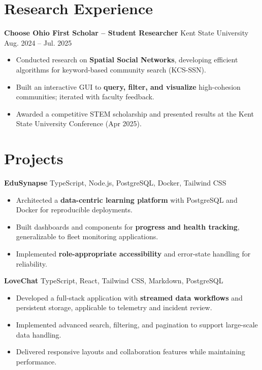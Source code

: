 \documentclass[10pt]{article}
\begin{document}
\section*{Research Experience}
\textbf{Choose Ohio First Scholar -- Student Researcher} \hfill Kent State University \\
Aug. 2024 -- Jul. 2025
\begin{itemize}
    \item Conducted research on \textbf{Spatial Social Networks}, developing efficient algorithms for keyword-based community search (KCS-SSN).
    \item Built an interactive GUI to \textbf{query, filter, and visualize} high-cohesion communities; iterated with faculty feedback.
    \item Awarded a competitive STEM scholarship and presented results at the Kent State University Conference (Apr 2025).
\end{itemize}

\section*{Projects}
\textbf{EduSynapse} \hfill TypeScript, Node.js, PostgreSQL, Docker, Tailwind CSS
\begin{itemize}
    \item Architected a \textbf{data-centric learning platform} with PostgreSQL and Docker for reproducible deployments.
    \item Built dashboards and components for \textbf{progress and health tracking}, generalizable to fleet monitoring applications.
    \item Implemented \textbf{role-appropriate accessibility} and error-state handling for reliability.
\end{itemize}

\textbf{LoveChat} \hfill TypeScript, React, Tailwind CSS, Markdown, PostgreSQL
\begin{itemize}
    \item Developed a full-stack application with \textbf{streamed data workflows} and persistent storage, applicable to telemetry and incident review.
    \item Implemented advanced search, filtering, and pagination to support large-scale data handling.
    \item Delivered responsive layouts and collaboration features while maintaining performance.
\end{itemize}
\end{document}
